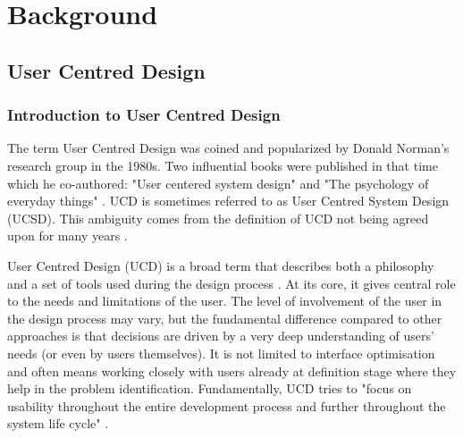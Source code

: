 
\chapter{Background}

	\section{User Centred Design}

		\subsection{Introduction to User Centred Design}

The term User Centred Design was coined and popularized by Donald Norman's research group in the 1980s. Two influential books were published in that time which he co-authored: "User centered system design" \citep{norman1986user} and "The psychology of everyday things" \citep{norman1988design}. UCD is sometimes referred to as User Centred System Design (UCSD). This ambiguity comes from the definition of UCD not being agreed upon for many years \citep{Gulliksen2003}.

User Centred Design (UCD) is a broad term that describes both a philosophy and a set of tools used during the design process \citep{norman1986user, norman2013design}. At its core, it gives central role to the needs and limitations of the user. The level of involvement of the user in the design process may vary, but the fundamental difference compared to other approaches is that decisions are driven by a very deep understanding of users' needs (or even by users themselves). It is not limited to interface optimisation and often means working closely with users already at definition stage where they help in the problem identification. Fundamentally, UCD tries to "focus on usability throughout the entire development process and further throughout the system life cycle" \citep{Gulliksen2003}.

